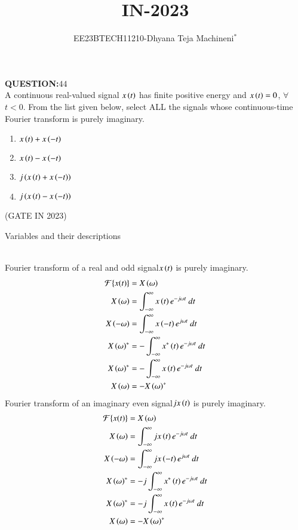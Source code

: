 \documentclass[journal,12pt,twocolumn]{IEEEtran}
\theoremstyle{remark}
\begin{document}

\vspace{3cm}
\title{\textbf{IN-2023}}
\author{EE23BTECH11210-Dhyana Teja Machineni$^{*}$%
}
\maketitle
\newpage
\bigskip

\textbf{QUESTION:$44$}\\
A continuous real-valued signal $x\left(t\right)$ has finite positive energy and $x\left(t\right) = 0$, $\forall$ $t < 0$. From the list given below, select ALL the signals whose
continuous-time Fourier transform is purely imaginary.\\
\begin{enumerate}
\item$x\left(t\right) + x\left(-t\right)$
\item$x\left(t\right) - x\left(-t\right)$
\item$j\left(x\left(t\right) + x\left(-t\right)\right)$
\item$j\left(x\left(t\right) - x\left(-t\right)\right)$
\end{enumerate}
\hfill{(GATE IN 2023)}\\
\solution
\begin{table}[h]
         \label{tab:table}
         
         \caption{Variables and their descriptions}
\end{table}\\
Fourier transform of a real and odd signal$x\left(t\right)$ is purely imaginary.\\
\begin{align}
\mathcal{F}\{x(t)\} &= X\brak{\omega}\\
X\brak{\omega}&=\int_{-\infty}^{\infty} x\brak{t} e^{-j \omega t} \ dt\\
X\brak{-\omega}&=\int_{-\infty}^{\infty} x\brak{-t} e^{j \omega t} \ dt\\
X\brak{\omega}^*&=-\int_{-\infty}^{\infty} x^*\brak{t} e^{-j \omega t} \ dt\\
X\brak{\omega}^*&=-\int_{-\infty}^{\infty} x\brak{t} e^{-j \omega t} \ dt\\
X\brak{\omega}&=-X\brak{\omega}^*
\end{align}
 Fourier transform of an imaginary even signal$jx\left(t\right)$ is purely imaginary.\\
\begin{align}
\mathcal{F}\{x(t)\} &= X\brak{\omega}\\
X\brak{\omega}&=\int_{-\infty}^{\infty} jx\brak{t} e^{-j \omega t} \ dt\\
X\brak{-\omega}&=\int_{-\infty}^{\infty} jx\brak{-t} e^{j \omega t} \ dt\\
X\brak{\omega}^*&=-j\int_{-\infty}^{\infty} x^*\brak{t} e^{-j \omega t} \ dt\\
X\brak{\omega}^*&=-j\int_{-\infty}^{\infty} x\brak{t} e^{-j \omega t} \ dt\\
X\brak{\omega}&=-X\brak{\omega}^*
\end{align}
\end{document}
